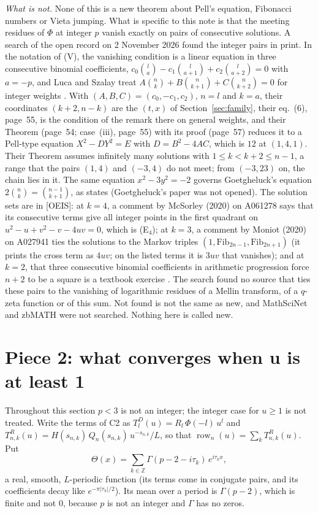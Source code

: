 \documentclass[11pt]{article}
\newcommand{\row}{\operatorname{row}}
\begin{document}
\medskip
\noindent\emph{What is not.} None of this is a new theorem about Pell's equation, Fibonacci numbers or Vieta jumping. What is specific to this note is that the meeting residues of $\Phi$ at integer $p$ vanish exactly on pairs of consecutive solutions. A search of the open record on 2 November 2026 found the integer pairs in print. In the notation of (V), the vanishing condition is a linear equation in three consecutive binomial coefficients, $c_0\binom{l}{a}-c_1\binom{l}{a+1}+c_2\binom{l}{a+2}=0$ with $a=-p$, and Luca and Szalay treat $A\binom nk+B\binom n{k+1}+C\binom n{k+2}=0$ for integer weights \cite{LS}. With $(A,B,C)=(c_0,-c_1,c_2)$, $n=l$ and $k=a$, their coordinates $(k+2,n-k)$ are the $(t,x)$ of Section~\ref{sec:family}, their eq.~(6), page~55, is the condition of the remark there on general weights, and their Theorem (page~54; case~(iii), page~55) with its proof (page~57) reduces it to a Pell-type equation $X^2-DY^2=E$ with $D=B^2-4AC$, which is $12$ at $(1,4,1)$. Their Theorem assumes infinitely many solutions with $1\le k<k+2\le n-1$, a range that the pairs $(1,4)$ and $(-3,4)$ do not meet; from $(-3,23)$ on, the chain lies in it. The same equation $x^2-3y^2=-2$ governs Goetgheluck's equation $2\binom nk=\binom{n-1}{k+1}$, as \cite[page~53]{LS} states (Goetgheluck's paper was not opened). The solution sets are in [OEIS]: at $k=4$, a comment by McSorley (2020) on A061278 says that its consecutive terms give all integer points in the first quadrant on $u^2-u+v^2-v-4uv=0$, which is (E$_4$); at $k=3$, a comment by Moniot (2020) on A027941 ties the solutions to the Markov triples $(1,\mathrm{Fib}_{2n-1},\mathrm{Fib}_{2n+1})$ (it prints the cross term as $4uv$; on the listed terms it is $3uv$ that vanishes); and at $k=2$, that three consecutive binomial coefficients in arithmetic progression force $n+2$ to be a square is a textbook exercise \cite[Exercise~11]{AMSI}. The search found no source that ties these pairs to the vanishing of logarithmic residues of a Mellin transform, of a $q$-zeta function or of this sum. Not found is not the same as new, and MathSciNet and zbMATH were not searched. Nothing here is called new.

\section{Piece 2: what converges when u is at least 1}\label{sec:P2}

Throughout this section $p<3$ is not an integer; the integer case for $u\ge1$ is not treated. Write the terms of C2 as $T^D_l(u)=R_l\,\Phi(-l)\,u^l$ and $T^R_{n,k}(u)=H(s_{n,k})\,Q_n(s_{n,k})\,u^{-s_{n,k}}/L$, so that $\row_n(u)=\sum_kT^R_{n,k}(u)$. Put
\[
\Theta(x)=\sum_{k\in\mathbb{Z}}\Gamma(p-2-i\tau_k)\,e^{i\tau_kx},
\]
a real, smooth, $L$-periodic function (its terms come in conjugate pairs, and its coefficients decay like $e^{-\pi|\tau_k|/2}$). Its mean over a period is $\Gamma(p-2)$, which is finite and not $0$, because $p$ is not an integer and $\Gamma$ has no zeros.
\end{document}
